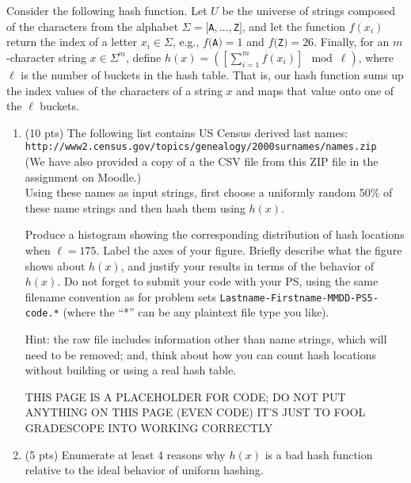 \documentclass[12pt]{article}
\begin{document}
\begin{enumerate}
	\smallskip Consider the following hash function. Let $U$ be the universe of strings composed of the characters from the alphabet $\Sigma=[${\tt A}$,\dots,${\tt Z}$]$, and let the function $f(x_{i})$ return the index of a letter $x_{i}\in \Sigma$, e.g., $f(${\tt A}$)=1$ and $f(${\tt Z}$)=26$. Finally, for an $m$-character string $x\in \Sigma^{m}$, define $h(x) = \left(\left[\sum_{i=1}^{m}f(x_{i})\right]\!\! \mod \ell\right)$, where $\ell$ is the number of buckets in the hash table. That is, our hash function sums up the index values of the characters of a string $x$ and maps that value onto one of the $\ell$ buckets.
	
	\begin{enumerate}
	\item \label{2a} (10 pts) The following list contains US Census derived last names: \\
	{\tt http://www2.census.gov/topics/genealogy/2000surnames/names.zip} \\
	(We have also provided a copy of a the CSV file from this ZIP file in the assignment on Moodle.) \\
	Using these names as input strings, first choose a uniformly random 50\% of these name strings and then hash them using $h(x)$.
	
	Produce a histogram showing the corresponding distribution of hash locations when $\ell=175$. Label the axes of your figure. Briefly describe what the figure shows about $h(x)$, and justify your results in terms of the behavior of $h(x)$. Do not forget to submit your code with your PS, using the same filename convention as for problem sets {\tt Lastname-Firstname-MMDD-PS5-code.*} (where the ``*'' can be any plaintext file type you like).
	 
	{\footnotesize Hint: the raw file includes information other than name strings, which will need to be removed; and, think about how you can count hash locations without building or using a real hash table.}
	\newpage
	\phantom{Delete this once you write your answer}
	\pagebreak
	
		THIS PAGE IS A PLACEHOLDER FOR CODE; DO NOT PUT ANYTHING ON THIS PAGE (EVEN CODE) IT'S JUST TO FOOL GRADESCOPE INTO WORKING CORRECTLY
	
	\pagebreak


	\item \label{2b} (5 pts) Enumerate at least 4 reasons why $h(x)$ is a bad hash function relative to the ideal behavior of uniform hashing.
	\pagebreak
	

\end{enumerate}
\end{enumerate}
\end{document}
